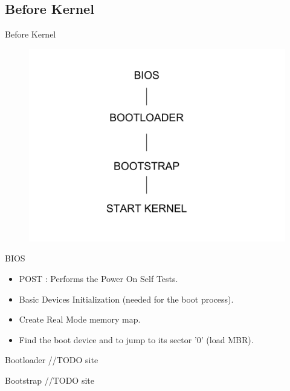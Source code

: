 \documentclass{workshop}
\begin{document}
\subsection{Before Kernel}
\begin{frame}{Before Kernel}
      \begin{figure}
         \includegraphics[scale=0.3]{img/boot.png}
      \end{figure}
\end{frame}

\begin{frame}{BIOS}
\begin{itemize}
\item POST : Performs the Power On Self Tests.
\item Basic Devices Initialization (needed for the boot process).
\item Create Real Mode memory map.
\item Find the boot device and to jump to its sector '0' (load MBR).
\end{itemize}
\end{frame}

\begin{frame}{Bootloader}
//TODO site
\end{frame}

\begin{frame}{Bootstrap}
//TODO site
\end{frame}
\end{document}
